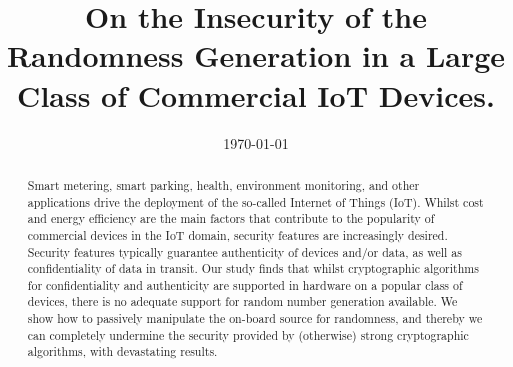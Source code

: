 \documentclass{article}
\title{On the Insecurity of the Randomness Generation in a Large Class of Commercial IoT Devices.}
\author{}
\date{\today}
\begin{document}
\maketitle

\begin{abstract}
Smart metering, smart parking, health, environment monitoring, and other applications drive the deployment of the so-called Internet of Things (IoT). Whilst cost and energy efficiency are the main factors that contribute to the popularity of commercial devices in the IoT domain, security features are increasingly desired. Security features typically guarantee authenticity of devices and/or data, as well as confidentiality of data in transit. Our study finds that whilst cryptographic algorithms for confidentiality and authenticity are supported in hardware on a popular class of devices, there is no adequate support for random number generation available. We show how to passively manipulate the on-board source for randomness, and thereby we can completely undermine the security provided by (otherwise) strong cryptographic algorithms, with devastating results. 
\end{abstract}








\appendix

\end{document}
